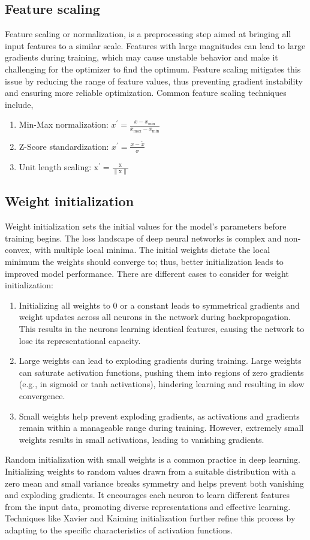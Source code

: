\subsection{Feature scaling}Feature scaling or normalization, is a preprocessing step aimed at bringing all input features to a similar scale. Features with large magnitudes can lead to large gradients during training, which may cause unstable behavior and make it challenging for the optimizer to find the optimum. Feature scaling mitigates this issue by reducing the range of feature values, thus preventing gradient instability and ensuring more reliable optimization. Common feature scaling techniques include,
\begin{enumerate}
\item Min-Max normalization: $x^{\prime}=\frac{x-x_{\min }}{x_{\max }-x_{\min }}$
\item Z-Score standardization: $x^{\prime}=\frac{x-\tilde{x}}{\sigma}$
\item Unit length scaling: $\mathrm{x}^{\prime}=\frac{\mathrm{x}}{\|\mathrm{x}\|}$
\end{enumerate}
\subsection{Weight initialization}
Weight initialization sets the initial values for the model's parameters before training begins. The loss landscape of deep neural networks is complex and non-convex, with multiple local minima. The initial weights dictate the local minimum the weights should converge to; thus, better initialization leads to improved model performance. There are different cases to consider for weight initialization: 
\begin{enumerate}
\item Initializing all weights to 0 or a constant leads to symmetrical gradients and weight updates across all neurons in the network during backpropagation. This results in the neurons learning identical features, causing the network to lose its representational capacity.
\item Large weights can lead to exploding gradients during training. Large weights can saturate activation functions, pushing them into regions of zero gradients (e.g., in sigmoid or tanh activations), hindering learning and resulting in slow convergence.
\item Small weights help prevent exploding gradients, as activations and gradients remain within a manageable range during training. However, extremely small weights results in small activations, leading to vanishing gradients. 
\end{enumerate}
Random initialization with small weights is a common practice in deep learning. Initializing weights to random values drawn from a suitable distribution with a zero mean and small variance breaks symmetry and helps prevent both vanishing and exploding gradients. It encourages each neuron to learn different features from the input data, promoting diverse representations and effective learning. Techniques like Xavier and Kaiming initialization further refine this process by adapting to the specific characteristics of activation functions.
